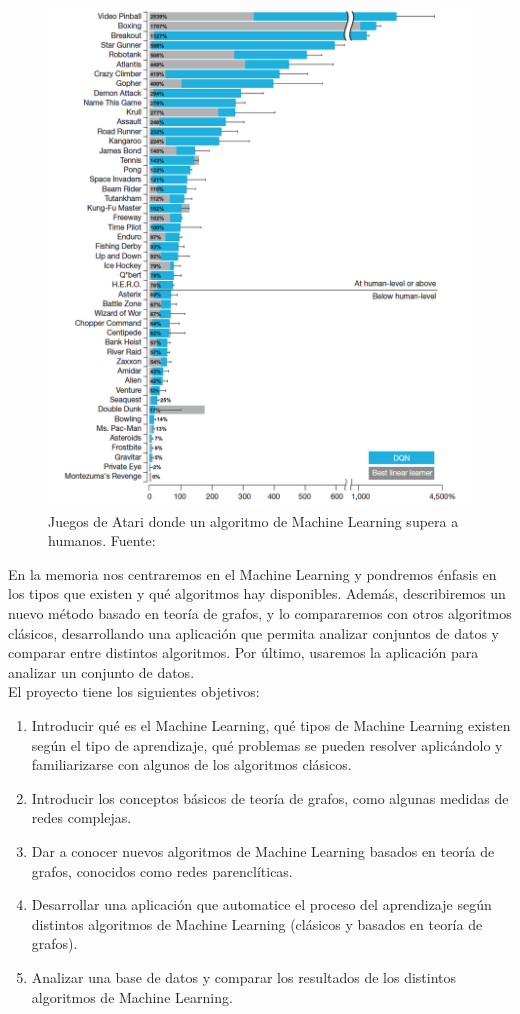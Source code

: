 \begin{figure}[tbph!]
\centering
\includegraphics[width=0.7\linewidth]{imagenes/atari.png}
\caption{Juegos de Atari donde un algoritmo de Machine Learning supera a humanos. Fuente:~\cite{mnih-dqn-2015}}
\label{fig:atari}
\end{figure}

En la memoria nos centraremos en el Machine Learning y pondremos énfasis en los tipos que existen y qué algoritmos hay disponibles. Además, describiremos un nuevo método basado en teoría de grafos, y lo compararemos con otros algoritmos clásicos, desarrollando una aplicación que permita analizar conjuntos de datos y comparar entre distintos algoritmos. Por último, usaremos la aplicación para analizar un conjunto de datos.\\

El proyecto tiene los siguientes objetivos:

\begin{enumerate}
\item Introducir qué es el Machine Learning, qué tipos de Machine Learning existen según el tipo de aprendizaje, qué problemas se pueden resolver aplicándolo y familiarizarse con algunos de los algoritmos clásicos.

\item Introducir los conceptos básicos de teoría de grafos, como algunas medidas de redes complejas.

\item Dar a conocer nuevos algoritmos de Machine Learning basados en teoría de grafos, conocidos como redes parenclíticas.

\item Desarrollar una aplicación que automatice el proceso del aprendizaje según distintos algoritmos de Machine Learning (clásicos y basados en teoría de grafos).

\item Analizar una base de datos y comparar los resultados de los distintos algoritmos de Machine Learning.
\end{enumerate}


